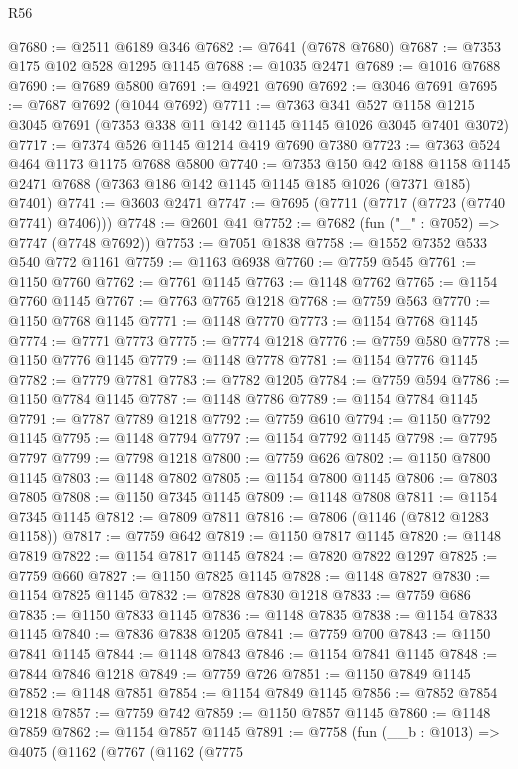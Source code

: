 \begin{lexlean}{R56}
\begin{coremodule}
@7680 := @2511 @6189 @346
@7682 := @7641 (@7678 @7680)
@7687 := @7353 @175 @102 @528 @1295 @1145
@7688 := @1035 @2471
@7689 := @1016 @7688
@7690 := @7689 @5800
@7691 := @4921 @7690
@7692 := @3046 @7691
@7695 := @7687 @7692 (@1044 @7692)
@7711 := @7363
    @341
    @527
    @1158
    @1215
    @3045
    @7691
    (@7353 @338 @11 @142 @1145 @1145 @1026 @3045 @7401 @3072)
@7717 := @7374 @526 @1145 @1214 @419 @7690 @7380
@7723 := @7363 @524 @464 @1173 @1175 @7688 @5800
@7740 := @7353
    @150
    @42
    @188
    @1158
    @1145
    @2471
    @7688
    (@7363 @186 @142 @1145 @1145 @185 @1026 (@7371 @185) @7401)
@7741 := @3603 @2471
@7747 := @7695 (@7711 (@7717 (@7723 (@7740 @7741) @7406)))
@7748 := @2601 @41
@7752 := @7682 (fun ("_" : @7052) => @7747 (@7748 @7692))
@7753 := @7051 @1838
@7758 := @1552 @7352 @533 @540 @772 @1161
@7759 := @1163 @6938
@7760 := @7759 @545
@7761 := @1150 @7760
@7762 := @7761 @1145
@7763 := @1148 @7762
@7765 := @1154 @7760 @1145
@7767 := @7763 @7765 @1218
@7768 := @7759 @563
@7770 := @1150 @7768 @1145
@7771 := @1148 @7770
@7773 := @1154 @7768 @1145
@7774 := @7771 @7773
@7775 := @7774 @1218
@7776 := @7759 @580
@7778 := @1150 @7776 @1145
@7779 := @1148 @7778
@7781 := @1154 @7776 @1145
@7782 := @7779 @7781
@7783 := @7782 @1205
@7784 := @7759 @594
@7786 := @1150 @7784 @1145
@7787 := @1148 @7786
@7789 := @1154 @7784 @1145
@7791 := @7787 @7789 @1218
@7792 := @7759 @610
@7794 := @1150 @7792 @1145
@7795 := @1148 @7794
@7797 := @1154 @7792 @1145
@7798 := @7795 @7797
@7799 := @7798 @1218
@7800 := @7759 @626
@7802 := @1150 @7800 @1145
@7803 := @1148 @7802
@7805 := @1154 @7800 @1145
@7806 := @7803 @7805
@7808 := @1150 @7345 @1145
@7809 := @1148 @7808
@7811 := @1154 @7345 @1145
@7812 := @7809 @7811
@7816 := @7806 (@1146 (@7812 @1283 @1158))
@7817 := @7759 @642
@7819 := @1150 @7817 @1145
@7820 := @1148 @7819
@7822 := @1154 @7817 @1145
@7824 := @7820 @7822 @1297
@7825 := @7759 @660
@7827 := @1150 @7825 @1145
@7828 := @1148 @7827
@7830 := @1154 @7825 @1145
@7832 := @7828 @7830 @1218
@7833 := @7759 @686
@7835 := @1150 @7833 @1145
@7836 := @1148 @7835
@7838 := @1154 @7833 @1145
@7840 := @7836 @7838 @1205
@7841 := @7759 @700
@7843 := @1150 @7841 @1145
@7844 := @1148 @7843
@7846 := @1154 @7841 @1145
@7848 := @7844 @7846 @1218
@7849 := @7759 @726
@7851 := @1150 @7849 @1145
@7852 := @1148 @7851
@7854 := @1154 @7849 @1145
@7856 := @7852 @7854 @1218
@7857 := @7759 @742
@7859 := @1150 @7857 @1145
@7860 := @1148 @7859
@7862 := @1154 @7857 @1145
@7891 := @7758
    (fun (__b : @1013) =>
    @4075
      (@1162
        (@7767
          (@1162
            (@7775

\end{coremodule}
\end{lexlean}
